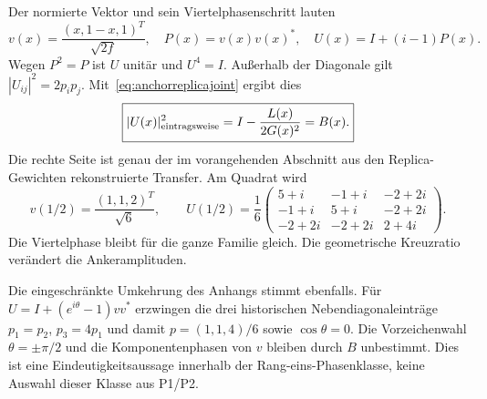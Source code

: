 Der normierte Vektor und sein Viertelphasenschritt lauten
\begin{equation}
v(x)=\frac{(x,1-x,1)^T}{\sqrt{2f}},\quad
P(x)=v(x)v(x)^*,\quad
U(x)=I+(i-1)P(x).
\end{equation}
Wegen $P^2=P$ ist $U$ unitär und $U^4=I$.
Außerhalb der Diagonale gilt $|U_{ij}|^2=2p_ip_j$.
Mit~\eqref{eq:anchorreplicajoint} ergibt dies
\begin{equation}\label{eq:wholeclockfamily}
\boxed{|U(x)|_{\rm eintragsweise}^2
=I-\frac{L(x)}{2G(x)^2}
=B(x).}
\end{equation}
Die rechte Seite ist genau der im vorangehenden Abschnitt aus den Replica-Gewichten rekonstruierte Transfer. Am Quadrat wird
\begin{equation}
v(1/2)=\frac{(1,1,2)^T}{\sqrt6},\qquad
U(1/2)=\frac16
\begin{pmatrix}
5+i&-1+i&-2+2i\\
-1+i&5+i&-2+2i\\
-2+2i&-2+2i&2+4i
\end{pmatrix}.
\end{equation}
Die Viertelphase bleibt für die ganze Familie gleich. Die geometrische Kreuzratio verändert die Ankeramplituden.

Die eingeschränkte Umkehrung des Anhangs stimmt ebenfalls. Für
$U=I+(e^{i\theta}-1)vv^*$ erzwingen die drei historischen Nebendiagonaleinträge
$p_1=p_2$, $p_3=4p_1$ und damit $p=(1,1,4)/6$ sowie
$\cos\theta=0$. Die Vorzeichenwahl $\theta=\pm\pi/2$ und die Komponentenphasen von $v$ bleiben durch $B$ unbestimmt. Dies ist eine Eindeutigkeitsaussage innerhalb der Rang-eins-Phasenklasse, keine Auswahl dieser Klasse aus P1/P2.



